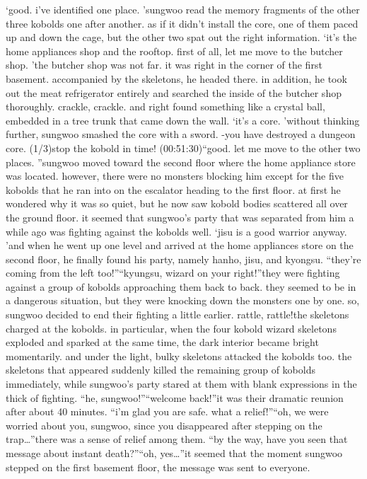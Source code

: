 ‘good.
 i’ve identified one place.
’sungwoo read the memory fragments of the other three kobolds one after another.
as if it didn’t install the core, one of them paced up and down the cage, but the other two spat out the right information.
‘it’s the home appliances shop and the rooftop.
 first of all, let me move to the butcher shop.
’the butcher shop was not far.
 it was right in the corner of the first basement.
accompanied by the skeletons, he headed there.
 in addition, he took out the meat refrigerator entirely and searched the inside of the butcher shop thoroughly.
crackle, crackle.
and right found something like a crystal ball, embedded in a tree trunk that came down the wall.
‘it’s a core.
’without thinking further, sungwoo smashed the core with a sword.
-you have destroyed a dungeon core.
 (1/3)stop the kobold in time! (00:51:30)“good.
 let me move to the other two places.
”sungwoo moved toward the second floor where the home appliance store was located.
however, there were no monsters blocking him except for the five kobolds that he ran into on the escalator heading to the first floor.
at first he wondered why it was so quiet, but he now saw kobold bodies scattered all over the ground floor.
 it seemed that sungwoo’s party that was separated from him a while ago was fighting against the kobolds well.
‘jisu is a good warrior anyway.
’and when he went up one level and arrived at the home appliances store on the second floor, he finally found his party, namely hanho, jisu, and kyongsu.
“they’re coming from the left too!”“kyungsu, wizard on your right!”they were fighting against a group of kobolds approaching them back to back.
they seemed to be in a dangerous situation, but they were knocking down the monsters one by one.
 so, sungwoo decided to end their fighting a little earlier.
rattle, rattle!the skeletons charged at the kobolds.
 in particular, when the four kobold wizard skeletons exploded and sparked at the same time, the dark interior became bright momentarily.
 and under the light, bulky skeletons attacked the kobolds too.
 the skeletons that appeared suddenly killed the remaining group of kobolds immediately, while sungwoo’s party stared at them with blank expressions in the thick of fighting.
“he, sungwoo!”“welcome back!”it was their dramatic reunion after about 40 minutes.
“i’m glad you are safe.
 what a relief!”“oh, we were worried about you, sungwoo, since you disappeared after stepping on the trap…”there was a sense of relief among them.
“by the way, have you seen that message about instant death?”“oh, yes…”it seemed that the moment sungwoo stepped on the first basement floor, the message was sent to everyone.
